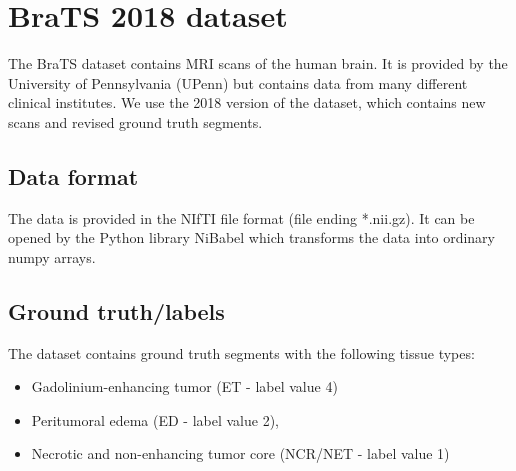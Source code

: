 \section{BraTS 2018 dataset}
The BraTS dataset \cite{menze2015multimodal} contains MRI scans of the human brain. It is provided by the University of Pennsylvania (UPenn) but contains data from many different clinical institutes.
We use the 2018 version of the dataset, which contains new scans and revised ground truth segments.

\subsection{Data format}
The data is provided in the NIfTI file format (file ending *.nii.gz). It can be opened by the Python library NiBabel\cite{nibabel} which transforms the data into ordinary numpy arrays.

\subsection{Ground truth/labels}
The dataset contains ground truth segments with the following tissue types:

\begin{itemize}
    \item Gadolinium-enhancing tumor (ET - label value 4)
    \item Peritumoral edema (ED - label value 2),
    \item Necrotic and non-enhancing tumor core (NCR/NET - label value 1)
\end{itemize}